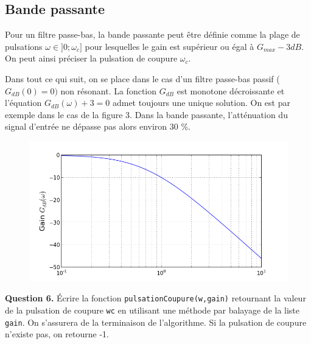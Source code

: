 \documentclass[11pt,fleqn]{book} %
\begin{document}
\pagebreak

\subsection{Bande passante}

\begin{dBox}
Pour un filtre passe-bas, la bande passante peut être définie comme la plage de pulsations $\omega \in ]0;\omega_c]$ pour lesquelles le gain est supérieur ou égal à $G_{max}-3 dB$. On peut ainsi préciser la pulsation de coupure $\omega_c$.
\end{dBox}



Dans tout ce qui suit, on se place dans le cas d'un filtre passe-bas passif ($G_{dB}(0) = 0)$ non résonant. La fonction $G_{dB}$ est monotone décroissante et l'équation $G_{dB}(\omega) + 3 = 0$ admet toujours une unique solution. On est par exemple dans le cas de la figure 3. Dans la bande passante, l'atténuation du signal d'entrée ne dépasse pas alors environ 30 \%.

\begin{figure}[!h]
\begin{center}
\includegraphics[scale=0.5]{figure_3.png} 
\end{center}
\end{figure}

\begin{tBox}
\textbf{Question 6.} Écrire la fonction \texttt{pulsationCoupure(w,gain)} retournant la valeur de la pulsation de coupure \texttt{wc} en utilisant une méthode par balayage de la liste \texttt{gain}. On s'assurera de la terminaison de l'algorithme. Si la pulsation de coupure n'existe pas, on retourne -1.
\end{tBox}
\end{document}
